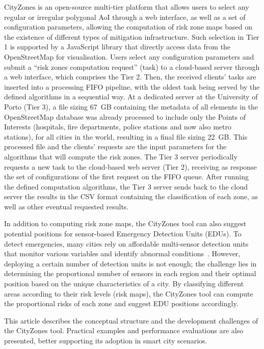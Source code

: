 \begin{refsection}
CityZones is an open-source multi-tier platform that allows users to select any regular or irregular polygonal AoI through a web interface, as well as a set of configuration parameters, allowing the computation of risk zone maps based on the existence of different types of mitigation infrastructure. Such selection in Tier 1 is supported by a JavaScript library that directly access data from the OpenStreetMap for visualisation. Users select any configuration parameters and submit a ``risk zones computation request'' (task) to a cloud-based server through a web interface, which comprises the Tier 2. Then, the received clients' tasks are inserted into a processing FIFO pipeline, with the oldest task being served by the defined algorithms in a sequential way. At a dedicated server at the University of Porto (Tier 3), a file sizing 67~GB containing the metadata of all elements in the OpenStreetMap database was already processed to include only the Points of Interests (hospitals, fire departments, police stations and now also metro stations), for all cities in the world, resulting in a final file sizing 22~GB. This processed file and the clients' requests are the input parameters for the algorithms that will compute the risk zones. The Tier 3 server periodically requests a new task to the cloud-based web server (Tier 2), receiving as response the set of configurations of the first request on the FIFO queue. After running the defined computation algorithms, the Tier 3 server sends back to the cloud server the results in the CSV format containing the classification of each zone, as well as other eventual requested results.

In addition to computing risk zone maps, the CityZones tool can also suggest potential positions for sensor-based Emergency Detection Units (EDUs). To detect emergencies, many cities rely on affordable multi-sensor detection units that monitor various variables and identify abnormal conditions~\cite{sensorsedus,sensorsedus2}. However, deploying a certain number of detection units is not enough; the challenge lies in determining the proportional number of sensors in each region and their optimal position based on the unique characteristics of a city. By classifying different areas according to their risk levels (risk maps), the CityZones tool can compute the proportional risks of each zone and suggest EDU positions accordingly.

This article describes the conceptual structure and the development challenges of the CityZones tool. Practical examples and performance evaluations are also presented, better supporting its adoption in smart city scenarios.


\end{refsection}
